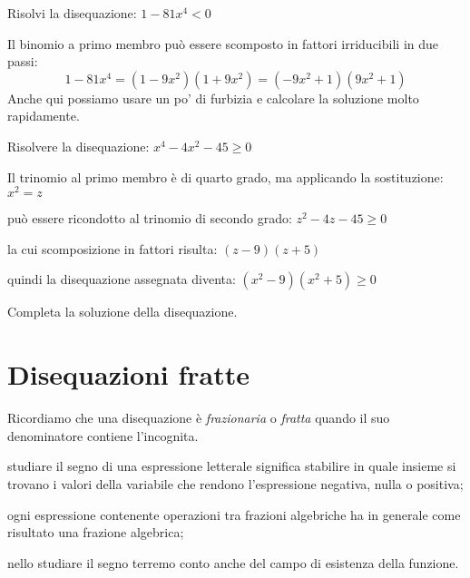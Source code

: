 \begin{esempio}
Risolvi la disequazione: \(1-81x^4<0\)

Il binomio a primo membro può essere scomposto in fattori irriducibili in due 
passi:
\[1-81x^4 = \left(1-9x^2\right)\left(1+9x^2\right)=
  \left(-9x^2+1\right)\left(9x^2+1\right)\]
Anche qui possiamo usare un po' di furbizia e calcolare la soluzione molto 
rapidamente.
\end{esempio}

\begin{esempio}
Risolvere la disequazione: \(x^4-4x^2-45 \ge 0\)

Il trinomio al primo membro è di quarto grado, ma applicando la 
sostituzione: 
\(x^2=z\)

può essere ricondotto al trinomio di secondo grado:
\(z^2-4z-45 \ge 0\)

la cui scomposizione in fattori risulta:
\(\left(z-9\right)\left(z+5\right)\)

quindi la disequazione assegnata diventa: 
\((x^2-9)(x^2+5) \ge 0\)

Completa la soluzione della disequazione.
\end{esempio}

% 


\section{Disequazioni fratte}
\label{sec:diseq_fratte}

Ricordiamo che una disequazione è \emph{frazionaria} o \emph{fratta} quando 
il suo denominatore contiene l'incognita. 

\begin{osservazione}
 \begin{itemize*}
\item studiare il segno di una espressione letterale significa stabilire in 
quale insieme si trovano i valori della variabile che rendono 
l'espressione negativa, nulla o positiva;
\item ogni espressione contenente operazioni tra frazioni algebriche ha in 
generale come risultato una frazione algebrica;
\item nello studiare il segno terremo conto anche del campo di esistenza 
della funzione.
\end{itemize*}
\end{osservazione}


